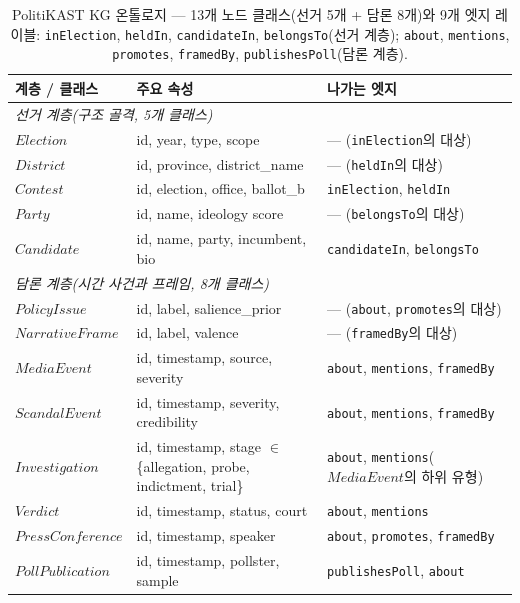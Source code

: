 \documentclass[11pt]{article}
\begin{document}
\begin{table}[h]
\centering
\caption{PolitiKAST KG 온톨로지 --- 13개 노드 클래스(선거 5개 + 담론 8개)와 9개 엣지 레이블: \texttt{inElection}, \texttt{heldIn}, \texttt{candidateIn}, \texttt{belongsTo}(선거 계층); \texttt{about}, \texttt{mentions}, \texttt{promotes}, \texttt{framedBy}, \texttt{publishesPoll}(담론 계층).}
\label{tab:kg-ontology}
\small
\begin{tabular}{p{}p{}p{}}
\toprule
계층 / 클래스 & 주요 속성 & 나가는 엣지 \\
\midrule
\multicolumn{3}{l}{\emph{선거 계층(구조 골격, 5개 클래스)}} \\
\midrule
$Election$ & id, year, type, scope & --- (\texttt{inElection}의 대상) \\
$District$ & id, province, district\_name & --- (\texttt{heldIn}의 대상) \\
$Contest$ & id, election, office, ballot\_b & \texttt{inElection}, \texttt{heldIn} \\
$Party$ & id, name, ideology score & --- (\texttt{belongsTo}의 대상) \\
$Candidate$ & id, name, party, incumbent, bio & \texttt{candidateIn}, \texttt{belongsTo} \\
\midrule
\multicolumn{3}{l}{\emph{담론 계층(시간 사건과 프레임, 8개 클래스)}} \\
\midrule
$PolicyIssue$ & id, label, salience\_prior & --- (\texttt{about}, \texttt{promotes}의 대상) \\
$NarrativeFrame$ & id, label, valence & --- (\texttt{framedBy}의 대상) \\
$MediaEvent$ & id, timestamp, source, severity & \texttt{about}, \texttt{mentions}, \texttt{framedBy} \\
$ScandalEvent$ & id, timestamp, severity, credibility & \texttt{about}, \texttt{mentions}, \texttt{framedBy} \\
$Investigation$ & id, timestamp, stage $\in$ \{allegation, probe, indictment, trial\} & \texttt{about}, \texttt{mentions}($MediaEvent$의 하위 유형) \\
$Verdict$ & id, timestamp, status, court & \texttt{about}, \texttt{mentions} \\
$PressConference$ & id, timestamp, speaker & \texttt{about}, \texttt{promotes}, \texttt{framedBy} \\
$PollPublication$ & id, timestamp, pollster, sample & \texttt{publishesPoll}, \texttt{about} \\
\bottomrule
\end{tabular}
\end{table}
\end{document}
